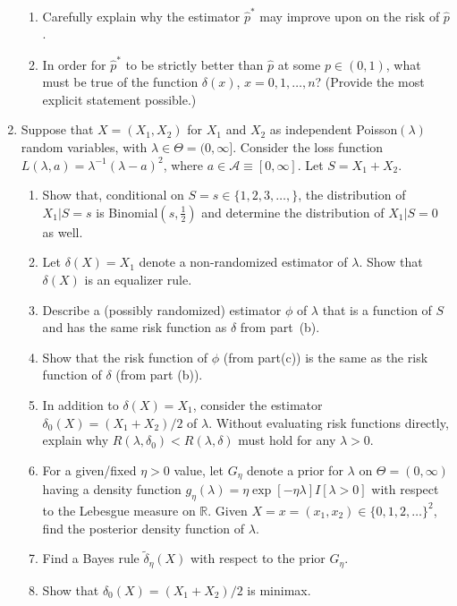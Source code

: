 \documentclass[12pt]{article}
\begin{document}
\begin{enumerate}
\begin{enumerate}
     \item Carefully explain why the estimator $\hat{p}^* $ may improve upon on the risk of $\hat{p}$.

    \item In order for $\hat{p}^*$ to be strictly better than $\hat{p}$ at some $p\in(0,1)$, what must be true of the function $\delta(x)$, $x=0,1,\ldots,n$? (Provide the most explicit statement possible.)

\end{enumerate}

\item Suppose that $X=(X_1,X_2)$ for $X_1$ and $X_2$ as independent Poisson$(\lambda)$ random variables, with $\lambda \in \Theta = (0,\infty]$.
Consider the loss function $L(\lambda,a) = \lambda^{-1}(\lambda -a)^2$, where $a \in \mathcal{A}\equiv [0,\infty]$.
Let $S=X_1 + X_2$.


       \begin{enumerate}\itemsep .2cm
    \item Show that, conditional on $S=s \in\{1,2,3,\ldots,\}$, the distribution of $X_1|S=s$ is Binomial$(s, \frac{1}{2})$ and determine the distribution of $X_1|S=0$ as well.

     \item Let $\delta(X)=X_1$ denote a non-randomized estimator of $\lambda$.  Show that $\delta(X)$ is an equalizer rule.


     \item Describe a (possibly randomized) estimator $\phi$ of $\lambda$ that is a function of $S$ and has the same risk function as $\delta$ from part~(b).

         \item Show that the risk function of $\phi$ (from part(c)) is the same as the risk function of $\delta$ (from part (b)).

         \item  In addition to $\delta(X)=X_1$, consider the estimator $\delta_0(X) = (X_1+X_2)/2$ of $\lambda$.    Without evaluating risk functions directly, explain why $R(\lambda,\delta_0)< R(\lambda,\delta)$ must hold for any $\lambda>0$. 
          \item For a given/fixed $\eta>0$ value, let  $G_\eta$ denote a prior for $\lambda$ on $\Theta=(0,\infty)$ having a density
          function $g_\eta(\lambda) = \eta \exp[- \eta \lambda]I[\lambda>0]$ with respect to the Lebesgue measure on $\mathbb{R}$.  Given $X=x=(x_1,x_2)\in\{0,1,2,\ldots\}^2$, find the posterior density function of $\lambda$.
             \item Find a Bayes rule $\tilde{\delta}_\eta(X)$ with respect to the prior $G_\eta$.
             \item Show that  $\delta_0(X) = (X_1+X_2)/2$ is minimax.
\end{enumerate}

\end{enumerate}
\end{document}
